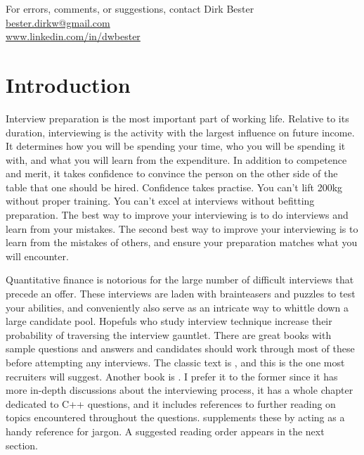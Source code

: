 \documentclass[a4paper]{article}
\begin{document}
\vfill
\begin{center}
For errors, comments, or suggestions, contact Dirk Bester\\
\href{mailto:bester.dirkw@gmail.com}{bester.dirkw@gmail.com}\\
\href{https://www.linkedin.com/in/dwbester}{www.linkedin.com/in/dwbester}
\end{center}


\clearpage

\setcounter{tocdepth}{2}
\tableofcontents

\clearpage

\renewcommand{\thepage}{\arabic{page}}
\setcounter{page}{1}

{}
\section*{Introduction}

Interview preparation is the most important part of working life.
Relative to its duration, interviewing is the activity with the largest influence on future income.
It determines how you will be spending your time, who you will be spending it with, and what you will learn from the expenditure.
In addition to competence and merit, it takes confidence to convince the person on the other side of the table that one should be hired.
Confidence takes practise.
You can't lift 200kg without proper training.
You can't excel at interviews without befitting preparation.
The best way to improve your interviewing is to do interviews and learn from your mistakes.
The second best way to improve your interviewing is to learn from the mistakes of others, and ensure your preparation matches what you will encounter.


Quantitative finance is notorious for the large number of difficult interviews that precede an offer.
These interviews are laden with brainteasers and puzzles to test your abilities, and conveniently also serve as an intricate way to whittle down a large candidate pool.
Hopefuls who study interview technique increase their probability of traversing the interview gauntlet.
There are great books with sample questions and answers and candidates should work through most of these before attempting any interviews.
The classic text is \citet{HeardOnTheStreet}, and this is the one most recruiters will suggest.
Another book is \citet{JoshiQA}.
I prefer it to the former since it has more in-depth discussions about the interviewing process, it has a whole chapter dedicated to C++ questions, and it includes references to further reading on topics encountered throughout the questions.
\citet{WilmottFAQ} supplements these by acting as a handy reference for jargon.
A suggested reading order appears in the next section.
\end{document}
